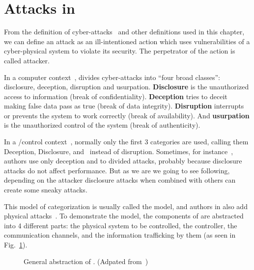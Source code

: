 \documentclass[../main.tex]{subfiles}
\begin{document}
\section{Attacks in \cps{}}\label{sec:attacks}

From the definition of cyber-attacks~\cite{Bishop2005} and other
definitions used in this chapter, we can define an attack as an ill-intentioned action which uses vulnerabilities of a cyber-physical system to violate its security.
The perpetrator of the action is called attacker.

In a computer context~\cite{Bishop2005},  divides cyber-attacks into ``four broad classes'':
disclosure, deception, disruption and usurpation.
\textbf{Disclosure} is the unauthorized access to information (break of confidentiality).
\textbf{Deception} tries to deceit making false data pass as true (break of data integrity).
\textbf{Disruption} interrupts or prevents the system to work correctly (break of availability). And \textbf{usurpation} is the unauthorized control of the system (break of authenticity).

In a \cps{}/control context~\cite{CardenasEtAl2008}, normally only the first 3 categories are used, calling them Deception, Disclosure, and~\DoS{} instead of disruption.
Sometimes, for instance~\cite{AminEtAl2009}, authors use only deception and \DoS{} to divided attacks, probably because disclosure attacks do not affect performance.
But as we are we going to see following, depending on the attacker disclosure attacks when combined with others can create some sneaky attacks.

This model of categorization is usually called the \DDD{} model, and authors in \cps{} also add physical attacks~\cite{DibajiEtAl2019}.
To demonstrate the \DDD{} model, the components of \cps{} are abstracted into 4 different parts: the physical system to be controlled, the controller, the communication channels, and the information trafficking by them  (as seen in Fig.~\ref{fig:cps_abstraction}).

\begin{figure}[h]
  \centering
\caption[General abstraction of CPS.]{General abstraction of \cps{}. (Adpated from~\cite{CardenasEtAl2008,AminEtAl2009})}\label{fig:cps_abstraction}
\end{figure}
\end{document}
